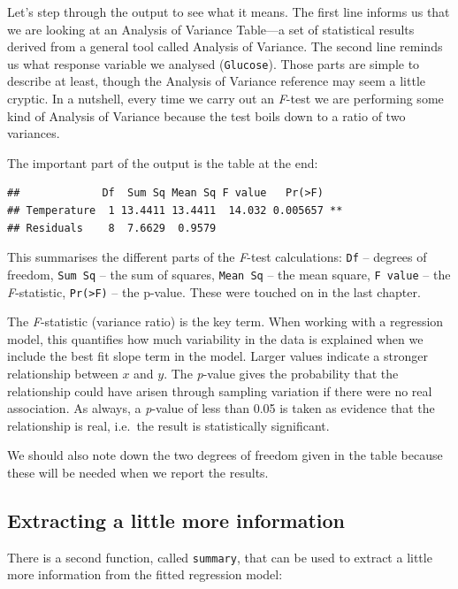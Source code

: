 \documentclass[
]{book}
\begin{document}
Let's step through the output to see what it means. The first line informs us that we are looking at an Analysis of Variance Table---a set of statistical results derived from a general tool called Analysis of Variance. The second line reminds us what response variable we analysed (\texttt{Glucose}). Those parts are simple to describe at least, though the Analysis of Variance reference may seem a little cryptic. In a nutshell, every time we carry out an \emph{F}-test we are performing some kind of Analysis of Variance because the test boils down to a ratio of two variances.

The important part of the output is the table at the end:

\begin{verbatim}
##             Df  Sum Sq Mean Sq F value   Pr(>F)    
## Temperature  1 13.4411 13.4411  14.032 0.005657 ** 
## Residuals    8  7.6629  0.9579
\end{verbatim}

This summarises the different parts of the \emph{F}-test calculations: \texttt{Df} -- degrees of freedom, \texttt{Sum\ Sq} -- the sum of squares, \texttt{Mean\ Sq} -- the mean square, \texttt{F\ value} -- the \emph{F}-statistic, \texttt{Pr(\textgreater{}F)} -- the p-value. These were touched on in the last chapter.

The \emph{F}-statistic (variance ratio) is the key term. When working with a regression model, this quantifies how much variability in the data is explained when we include the best fit slope term in the model. Larger values indicate a stronger relationship between \(x\) and \(y\). The \emph{p}-value gives the probability that the relationship could have arisen through sampling variation if there were no real association. As always, a \emph{p}-value of less than 0.05 is taken as evidence that the relationship is real, i.e.~the result is statistically significant.

We should also note down the two degrees of freedom given in the table because these will be needed when we report the results.

\hypertarget{extracting-a-little-more-information}{%
\subsection{Extracting a little more information}\label{extracting-a-little-more-information}}

There is a second function, called \texttt{summary}, that can be used to extract a little more information from the fitted regression model:
\end{document}

